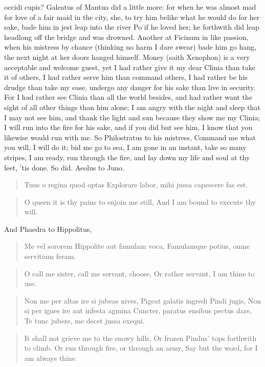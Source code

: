 occidi cupis? Galeatus of Mantua did a little more: for when he
was almost mad for love of a fair maid in the city, she, to try him
belike what he would do for her sake, bade him in jest leap into the
river Po if he loved her; he forthwith did leap headlong off the bridge
and was drowned. Another at Ficinum in like passion, when his mistress
by chance (thinking no harm I dare swear) bade him go hang, the next
night at her doors hanged himself. Money (saith Xenophon) is a
very acceptable and welcome guest, yet I had rather give it my dear
Clinia than take it of others, I had rather serve him than command
others, I had rather be his drudge than take my ease, undergo any
danger for his sake than live in security. For I had rather see Clinia
than all the world besides, and had rather want the sight of all other
things than him alone; I am angry with the night and sleep that I may
not see him, and thank the light and sun because they show me my
Clinia; I will run into the fire for his sake, and if you did but see
him, I know that you likewise would run with me. So Philostratus to his
mistress, Command me what you will, I will do it; bid me go to
sea, I am gone in an instant, take so many stripes, I am ready, run
through the fire, and lay down my life and soul at thy feet, 'tis done.
So did. Aeolus to Juno.

\begin{latin}
\begin{verse}
Tuus o regina quod optas
Explorare labor, mihi jussa capescere fas est.
\end{verse}
\end{latin}
\translationrule%
\begin{verse}%
O queen it is thy pains to enjoin me still,
And I am bound to execute thy will.
\end{verse}%

And Phaedra to Hippolitus,

\begin{latin}
\begin{verse}
Me vel sororem Hippolite aut famulam voca,
Famulamque potius, omne servitium feram.
\end{verse}
\end{latin}
\translationrule%
\begin{verse}%
O call me sister, call me servant, choose,
Or rather servant, I am thine to use.
\end{verse}%

\begin{latin}
\begin{verse}
Non me per altas ire si jubeas nives,
Pigeat galatis ingredi Pindi jugis,
Non si per ignes ire aut infesta agmina
Cuncter, paratus ensibus pectus dare,
Te tunc jubere, me decet jussa exequi.
\end{verse}
\end{latin}
\translationrule%
\begin{verse}%
It shall not grieve me to the snowy hills,
Or frozen Pindus' tops forthwith to climb.
Or run through fire, or through an army,
Say but the word, for I am always thine.
\end{verse}%

